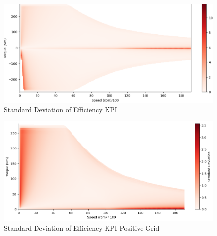\documentclass{report} %
\begin{document}
\begin{figure}[H]
    \centering
    \includegraphics[width=1\textwidth]{./ReportImages/stddev_y2.png} 
    \caption{Standard Deviation of Efficiency \ac{KPI}} 
    \label{fig:Standard Deviation of 3D KPI(Efficiency)}
\end{figure}

\begin{figure}[H]
    \centering
    \includegraphics[width=1\textwidth]{./ReportImages/pos_stddev_y2.png} 
    \caption{Standard Deviation of Efficiency \ac{KPI} Positive Grid} 
    \label{fig:Standard Deviation of 3D KPI(Efficiency) Positive Grid}
\end{figure}
\end{document}
